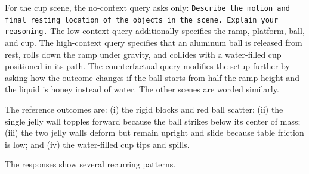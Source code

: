 \documentclass{article}
\begin{document}
For the cup scene, the no-context query asks only: \texttt{Describe the motion and final resting location of the objects in the scene. Explain your reasoning.} The low-context query additionally specifies the ramp, platform, ball, and cup. The high-context query specifies that an aluminum ball is released from rest, rolls down the ramp under gravity, and collides with a water-filled cup positioned in its path. The counterfactual query modifies the setup further by asking how the outcome changes if the ball starts from half the ramp height and the liquid is honey instead of water. The other scenes are worded similarly. 

The reference outcomes are: (i) the rigid blocks and red ball scatter; (ii) the single jelly wall topples forward because the ball strikes below its center of mass; (iii) the two jelly walls deform but remain upright and slide because table friction is low; and (iv) the water-filled cup tips and spills.

The responses show several recurring patterns.
\end{document}
